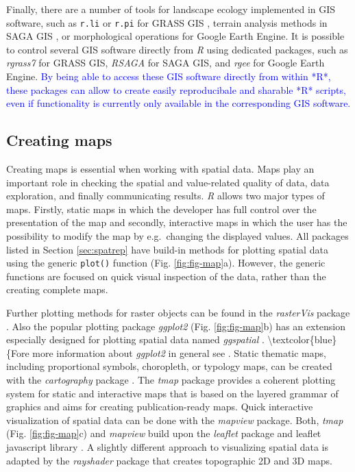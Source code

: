\documentclass[smallextended]{svjour3}       %
\begin{document}
Finally, there are a number of tools for landscape ecology implemented in GIS software, such as \texttt{r.li} or \texttt{r.pi} for GRASS GIS \cite{Wegmann2018,Neteler2012,Porta2017}, terrain analysis methods in SAGA GIS \cite{Conrad2015}, or morphological operations for Google Earth Engine.
It is possible to control several GIS software directly from \emph{R} using dedicated packages, such as \emph{rgrass7} \cite{Bivand2021} for GRASS GIS, \emph{RSAGA} \cite{Brenning2018} for SAGA GIS, and \emph{rgee} \cite{Aybar2020} for Google Earth Engine.
\textcolor{blue}{By being able to access these GIS software directly from within *R*, these packages can allow to create easily reproducibale and sharable *R* scripts, even if functionality is currently only available in the corresponding GIS software.}

\hypertarget{creating-maps}{%
\subsection{Creating maps}\label{creating-maps}}

Creating maps is essential when working with spatial data.
Maps play an important role in checking the spatial and value-related quality of data, data exploration, and finally communicating results.
\emph{R} allows two major types of maps.
Firstly, static maps in which the developer has full control over the presentation of the map and secondly, interactive maps in which the user has the possibility to modify the map by e.g.~changing the displayed values.
All packages listed in Section \ref{sec:spatrep} have build-in methods for plotting spatial data using the generic \texttt{plot()} function (Fig. \ref{fig:fig-map}a).
However, the generic functions are focused on quick visual inspection of the data, rather than the creating complete maps.

Further plotting methods for raster objects can be found in the \emph{rasterVis} package \cite{Lamigueiro2020}.
Also the popular plotting package \emph{ggplot2} \cite{Wickham2016} (Fig. \ref{fig:fig-map}b) has an extension especially designed for plotting spatial data named \emph{ggspatial} \cite{Dunnington2020}.
\textbackslash textcolor\{blue\}\{Fore more information about \emph{ggplot2} in general see \cite{Wickham2016}.
Static thematic maps, including proportional symbols, choropleth, or typology maps, can be created with the \emph{cartography} package \cite{Giraud2016}.
The \emph{tmap} package provides a coherent plotting system for static and interactive maps that is based on the layered grammar of graphics \cite{Tennekes2018} and aims for creating publication-ready maps.
Quick interactive visualization of spatial data can be done with the \emph{mapview} package\cite{Appelhans2020}.
Both, \emph{tmap} (Fig. \ref{fig:fig-map}c) and \emph{mapview} build upon the \emph{leaflet} package and leaflet javascript library \cite{Cheng2021}.
A slightly different approach to visualizing spatial data is adapted by the \emph{rayshader} package \cite{Morgen-Wall2020} that creates topographic 2D and 3D maps.
\end{document}
